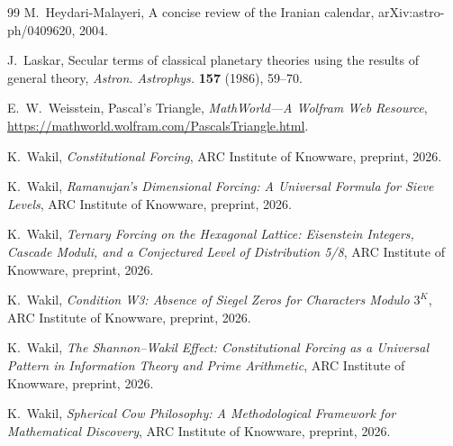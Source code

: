 \documentclass[11pt]{amsart}
\begin{document}
\begin{thebibliography}{99}
M.~Heydari-Malayeri, A concise review of the Iranian calendar, arXiv:astro-ph/0409620, 2004.

J.~Laskar, Secular terms of classical planetary theories using the results of general theory, \emph{Astron. Astrophys.} \textbf{157} (1986), 59--70.

E.~W.~Weisstein, Pascal's Triangle, \emph{MathWorld---A Wolfram Web Resource}, \url{https://mathworld.wolfram.com/PascalsTriangle.html}.

K.~Wakil, \emph{Constitutional Forcing}, ARC Institute of Knowware, preprint, 2026.

K.~Wakil, \emph{Ramanujan's Dimensional Forcing: A Universal Formula for Sieve Levels}, ARC Institute of Knowware, preprint, 2026.

K.~Wakil, \emph{Ternary Forcing on the Hexagonal Lattice: Eisenstein Integers, Cascade Moduli, and a Conjectured Level of Distribution 5/8}, ARC Institute of Knowware, preprint, 2026.

K.~Wakil, \emph{Condition W3: Absence of Siegel Zeros for Characters Modulo $3^K$}, ARC Institute of Knowware, preprint, 2026.

K.~Wakil, \emph{The Shannon--Wakil Effect: Constitutional Forcing as a Universal Pattern in Information Theory and Prime Arithmetic}, ARC Institute of Knowware, preprint, 2026.

K.~Wakil, \emph{Spherical Cow Philosophy: A Methodological Framework for Mathematical Discovery}, ARC Institute of Knowware, preprint, 2026.

\end{thebibliography}
\end{document}
